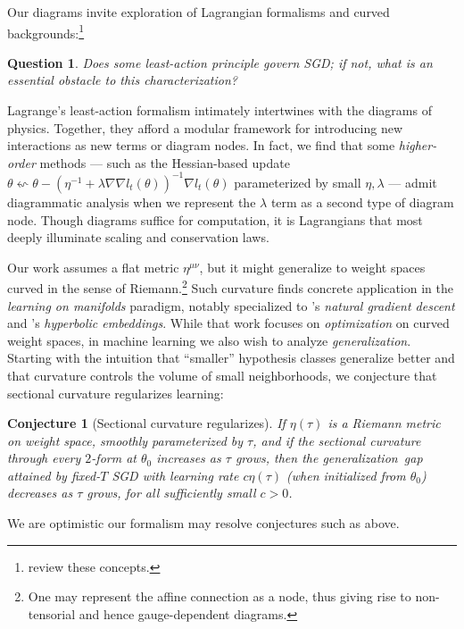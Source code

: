 \documentclass[openany, notitlepage, justified]{tufte-book}
\theoremstyle{plain}
\newtheorem{conj}{Conjecture}
\newtheorem{quest}{Question}
\theoremstyle{definition}
\begin{document}
        Our diagrams invite exploration of Lagrangian formalisms and curved
        backgrounds:\footnote{
            \citet{la60, la51} review these concepts.
        }
        \begin{quest}
            Does some least-action principle govern SGD; if not, what is an
            essential obstacle to this characterization?
        \end{quest}
        Lagrange's least-action formalism intimately intertwines with the
        diagrams of physics.  Together, they afford a modular framework for
        introducing new interactions as new terms or diagram nodes.  In fact,
        we find that some \emph{higher-order} methods --- such as the
        Hessian-based update
        $
            \theta \leftsquigarrow
            \theta -
            (\eta^{-1} + \lambda \nabla \nabla l_t(\theta))^{-1}
            \nabla l_t(\theta)
        $
        parameterized by small $\eta, \lambda$ --- admit diagrammatic analysis
        when we represent the $\lambda$ term as a second type of diagram node.
        Though diagrams suffice for computation, it is Lagrangians that most
        deeply illuminate scaling and conservation laws.

        Our work assumes a flat metric $\eta^{\mu\nu}$, but it might
        generalize to weight spaces curved in the sense of Riemann.\footnote{
            One may represent the affine connection as a node, thus giving
            rise to non-tensorial and hence gauge-dependent diagrams.
        }  Such curvature finds concrete application in the \emph{learning on
        manifolds} paradigm,\cite{ab07, zh16} notably specialized to
        \citet{am98}'s \emph{natural gradient descent} and \citet{ni17}'s
        \emph{hyperbolic embeddings}.  While that work focuses on
        \emph{optimization} on curved weight spaces, in machine learning we
        also wish to analyze \emph{generalization}.
        Starting with the intuition that ``smaller'' hypothesis classes
        generalize better and that curvature controls the volume of small
        neighborhoods, we conjecture that sectional curvature regularizes
        learning:
        \begin{conj}[Sectional curvature regularizes]
            If $\eta(\tau)$ is a Riemann metric on weight space, smoothly
            parameterized by $\tau$, and if the sectional curvature through
            every $2$-form at $\theta_0$ increases as $\tau$ grows, then
            the generalization\ gap attained by fixed-$T$ SGD with learning rate $c
            \eta(\tau)$ (when initialized from $\theta_0$) decreases as $\tau$
            grows, for all sufficiently small $c>0$.
        \end{conj}
        We are optimistic our formalism may resolve conjectures such as above.
\end{document}
